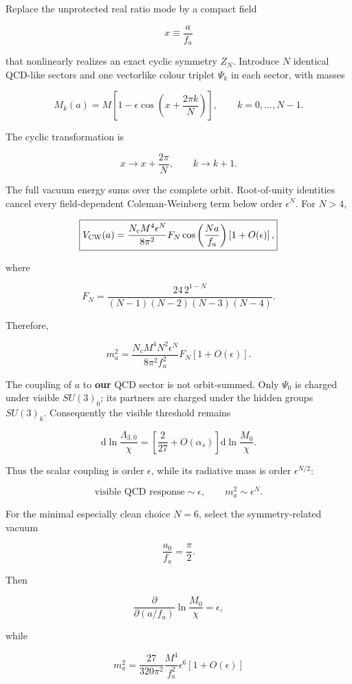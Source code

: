 \documentclass[11pt,a4paper]{article}
\begin{document}
Replace the unprotected real ratio mode by a compact field

\[
x\equiv \frac{a}{f_a}
\]

that nonlinearly realizes an exact cyclic symmetry \(Z_N\). Introduce
\(N\) identical QCD-like sectors and one vectorlike colour triplet
\(\Psi_k\) in each sector, with masses

\[
\boxed{
M_k(a)=M\left[1-\epsilon\cos\left(x+\frac{2\pi k}{N}\right)\right],
\qquad k=0,\ldots,N-1.
}
\]

The cyclic transformation is

\[
x\rightarrow x+\frac{2\pi}{N},
\qquad
k\rightarrow k+1.
\]

The full vacuum energy sums over the complete orbit. Root-of-unity
identities cancel every field-dependent Coleman-Weinberg term below
order \(\epsilon^N\). For \(N>4\),

\[
\boxed{
V_{\rm CW}(a)
=
\frac{N_cM^4\epsilon^N}{8\pi^2}
F_N
\cos\left(\frac{Na}{f_a}\right)
\left[1+O(\epsilon)\right],
}
\]

where

\[
\boxed{
F_N
=
\frac{24\,2^{1-N}}
{(N-1)(N-2)(N-3)(N-4)}.
}
\]

Therefore,

\[
\boxed{
m_a^2
=
\frac{N_cM^4N^2\epsilon^N}{8\pi^2f_a^2}F_N
\left[1+O(\epsilon)\right].}
\]

The coupling of \(a\) to \textbf{our} QCD sector is not orbit-summed.
Only \(\Psi_0\) is charged under visible \(SU(3)_0\); its partners are
charged under the hidden groups \(SU(3)_k\). Consequently the visible
threshold remains

\[
\boxed{
\mathrm d\ln\frac{\Lambda_{3,0}}{\chi}
=
\left[\frac{2}{27}+O(\alpha_s)\right]
\mathrm d\ln\frac{M_0}{\chi}.
}
\]

Thus the scalar coupling is order \(\epsilon\), while its radiative mass
is order \(\epsilon^{N/2}\):

\[
\boxed{
\text{visible QCD response}\sim\epsilon,
\qquad
m_a^2\sim\epsilon^N.
}
\]

For the minimal especially clean choice \(N=6\), select the
symmetry-related vacuum

\[
\frac{a_0}{f_a}=\frac{\pi}{2}.
\]

Then

\[
\frac{\partial}{\partial(a/f_a)}
\ln\frac{M_0}{\chi}
=\epsilon,
\]

while

\[
\boxed{
 m_a^2
 =
 \frac{27}{320\pi^2}
 \frac{M^4}{f_a^2}\epsilon^6
 \left[1+O(\epsilon)\right]
}
\]
\end{document}

